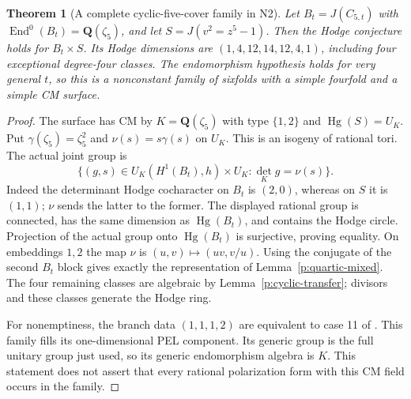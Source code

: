 \documentclass[11pt,reqno]{article}
\theoremstyle{emphasizedplain}
\newtheorem{theorem}{Theorem}[section]
\theoremstyle{emphasizeddefinition}
\theoremstyle{emphasizeddefinition}
\DeclareMathOperator{\End}{End}
\DeclareMathOperator{\Hg}{Hg}
\newcommand{\Q}{\mathbf Q}
\begin{document}
\begin{theorem}[A complete cyclic-five-cover family in N2]\label{p:N2cyclic}
Let $B_t=J(C_{5,t})$ with $\End^0(B_t)=\Q(\zeta_5)$, and let
$S=J(v^2=z^5-1)$. Then the Hodge conjecture holds for $B_t\times S$.
Its Hodge dimensions are $(1,4,12,14,12,4,1)$, including four
exceptional degree-four classes. The endomorphism hypothesis holds
for very general $t$, so this is a nonconstant family of sixfolds
with a simple fourfold and a simple CM surface.
\end{theorem}
\begin{proof}
The surface has CM by $K=\Q(\zeta_5)$ with type $\{1,2\}$ and
$\Hg(S)=U_K$. Put $\gamma(\zeta_5)=\zeta_5^2$ and
$\nu(s)=s\gamma(s)$ on $U_K$. This is an isogeny of rational
tori. The actual joint group is
\[
 \{(g,s)\in U_K(H^1(B_t),h)\times U_K:
                  \det_K g=\nu(s)\}.
\]
Indeed the determinant Hodge cocharacter on $B_t$ is $(2,0)$,
whereas on $S$ it is $(1,1)$; $\nu$ sends the latter to the former.
The displayed rational group is connected, has the same dimension
as $\Hg(B_t)$, and contains the Hodge circle. Projection of the
actual group onto $\Hg(B_t)$ is surjective, proving equality.
On embeddings $1,2$ the map $\nu$ is $(u,v)\mapsto(uv,v/u)$.
Using the conjugate of the second $B_t$ block gives exactly the
representation of Lemma~\ref{p:quartic-mixed}. The four remaining
classes are algebraic by Lemma~\ref{p:cyclic-transfer}; divisors
and these classes generate the Hodge ring.

For nonemptiness, the branch data $(1,1,1,2)$ are equivalent to
case 11 of \cite[Table 1]{MoonenCyclic}. This family fills its
one-dimensional PEL component. Its generic group is the full
unitary group just used, so its generic endomorphism algebra is $K$.
This statement does not assert that every rational polarization
form with this CM field occurs in the family.
\end{proof}
\end{document}
